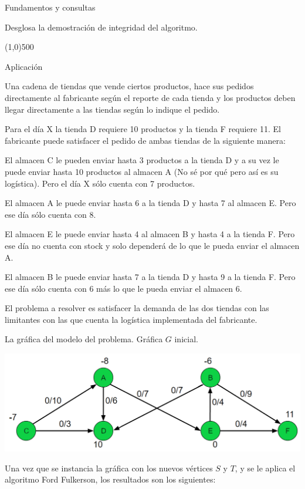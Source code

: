 \documentclass{article}
\begin{document}
\begin{section} {Fundamentos y consultas}
\begin{subsection}{Desglosa la demostración de integridad del algoritmo.}
	\end{subsection}

	\line(1,0){500}

\end{section}

\begin{section}{Aplicación}
	
	Una cadena de tiendas que vende ciertos productos, hace sus pedidos directamente al fabricante según el reporte de cada tienda y los productos deben llegar directamente a las tiendas según lo indique el pedido. 
	
	Para el día X la tienda D requiere 10 productos y la tienda F requiere 11. El fabricante puede satisfacer el pedido de ambas tiendas de la siguiente manera:
	
	El almacen C le pueden enviar hasta 3 productos a la tienda D y a su vez le puede enviar hasta 10 productos al almacen A (No sé por qué pero así es su logística). Pero el día X sólo cuenta con 7 productos.
	
	El almacen A le puede enviar hasta 6 a la tienda D y hasta 7 al almacen E. Pero ese día sólo cuenta con 8.
	
	El almacen E le puede enviar hasta 4 al almacen B y hasta 4 a la tienda F. Pero ese día no cuenta con stock y solo dependerá de lo que le pueda enviar el almacen A.
	
	El almacen B le puede enviar hasta 7 a la tienda D y hasta 9 a la tienda F. Pero ese día sólo cuenta con 6 más lo que le pueda enviar el almacen 6.
	
	El problema a resolver es satisfacer la demanda de las dos tiendas con las limitantes con las que cuenta la logística implementada del fabricante.
	
	La gráfica del modelo del problema. Gráfica $G$ inicial.
	
	\includegraphics[width=\textwidth]{graph-initial}

	Una vez que se instancia la gráfica con los nuevos vértices $S$ y $T$, y se le aplica el algoritmo Ford Fulkerson, los resultados son los siguientes:
	

\end{section}
\end{document}

